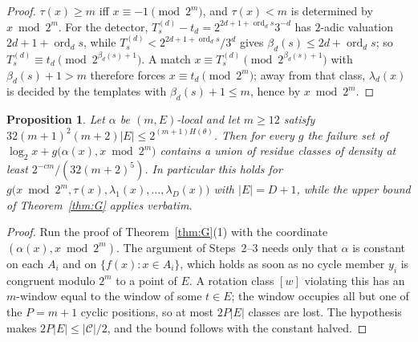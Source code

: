 \documentclass[11pt]{article}
\newtheorem{proposition}[theorem]{Proposition}
\theoremstyle{definition}
\theoremstyle{remark}
\newcommand{\ord}{\operatorname{ord}}
\begin{document}
\begin{proof}
$\tau(x)\ge m$ iff $x\equiv-1\pmod{2^{m}}$, and $\tau(x)<m$ is determined
by $x\bmod2^{m}$. For the detector, $T^{(d)}_s-t_d=2^{2d+1+\ord_ds}3^{-d}$
has $2$-adic valuation $2d+1+\ord_ds$, while
$T^{(d)}_s<2^{2d+1+\ord_ds}/3^{d}$ gives $\beta_d(s)\le2d+\ord_ds$; so
$T^{(d)}_s\equiv t_d\pmod{2^{\beta_d(s)+1}}$. A match
$x\equiv T^{(d)}_s\pmod{2^{\beta_d(s)+1}}$ with $\beta_d(s)+1>m$ therefore
forces $x\equiv t_d\pmod{2^{m}}$; away from that class, $\lambda_d(x)$ is
decided by the templates with $\beta_d(s)+1\le m$, hence by $x\bmod2^{m}$.
\end{proof}

\begin{proposition}\label{prop:localdensity}
Let $\alpha$ be $(m,E)$-local and let $m\ge12$ satisfy
$32(m+1)^{2}(m+2)|E|\le2^{(m+1)H(\theta)}$. Then for every $g$ the
failure set of $\log_2x+g\bigl(\alpha(x),x\bmod2^{m}\bigr)$ contains a
union of residue classes of density at least $2^{-cm}/(32(m+2)^{5})$. In
particular this holds for
$g\bigl(x\bmod2^{m},\tau(x),\lambda_1(x),\dots,\lambda_D(x)\bigr)$ with
$|E|=D+1$, while the upper bound of Theorem~\ref{thm:G} applies verbatim.
\end{proposition}

\begin{proof}
Run the proof of Theorem~\ref{thm:G}(1) with the coordinate
$(\alpha(x),x\bmod2^{m})$. The argument of Steps~2--3 needs only that
$\alpha$ is constant on each $A_i$ and on $\{f(x):x\in A_i\}$, which holds
as soon as no cycle member $y_i$ is congruent modulo $2^{m}$ to a point of
$E$. A rotation class $[w]$ violating this has an $m$-window equal to the
window of some $t\in E$; the window occupies all but one of the $P=m+1$
cyclic positions, so at most $2P|E|$ classes are lost. The hypothesis
makes $2P|E|\le|\mathcal C|/2$, and the bound follows with the constant
halved.
\end{proof}
\end{document}
